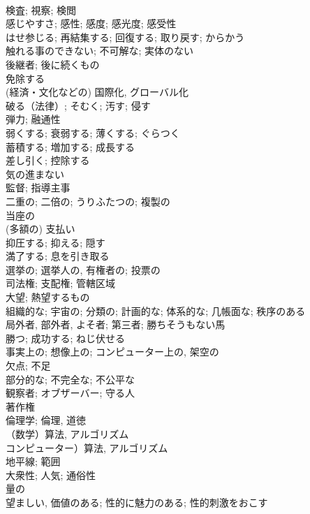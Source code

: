 \documentclass[8pt]{extreport}
\begin{document}
\begin{CJK}{UTF8}{min}
\\	検査; 視察; 検閲	
\\	感じやすさ; 感性; 感度; 感光度; 感受性	
\\	はせ参じる; 再結集する; 回復する; 取り戻す; からかう	
\\	触れる事のできない; 不可解な; 実体のない	
\\	後継者; 後に続くもの	
\\	免除する	
\\	(経済・文化などの) 国際化, グローバル化	
\\	破る（法律）; そむく; 汚す; 侵す	
\\	弾力; 融通性	
\\	弱くする; 衰弱する; 薄くする; ぐらつく	
\\	蓄積する; 増加する; 成長する	
\\	差し引く; 控除する	
\\	気の進まない	
\\	監督; 指導主事	
\\	二重の; 二倍の; うりふたつの; 複製の	
\\	当座の	
\\	(多額の) 支払い	
\\	抑圧する; 抑える; 隠す	
\\	満了する; 息を引き取る	
\\	選挙の; 選挙人の, 有権者の; 投票の	
\\	司法権; 支配権; 管轄区域
\\	大望; 熱望するもの	
\\	組織的な; 宇宙の; 分類の; 計画的な; 体系的な; 几帳面な; 秩序のある	
\\	局外者, 部外者, よそ者; 第三者; 勝ちそうもない馬	
\\	勝つ; 成功する; ねじ伏せる	
\\	事実上の; 想像上の; コンピューター上の, 架空の	
\\	欠点; 不足	
\\	部分的な; 不完全な; 不公平な	
\\	観察者; オブザーバー; 守る人	
\\	著作権	
\\	倫理学; 倫理, 道徳	
\\	（数学）算法, アルゴリズム 
\\	コンピューター）算法, アルゴリズム	
\\	地平線; 範囲	
\\	大衆性; 人気; 通俗性	
\\	量の	
\\	望ましい, 価値のある; 性的に魅力のある; 性的刺激をおこす	

\end{CJK}
\end{document}
